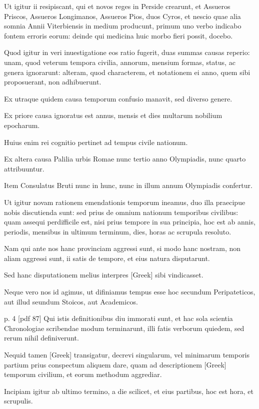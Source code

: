 Ut igitur ii resipiscant, qui et novos reges in Perside crearunt,
et Assueros Priscos, Assueros Longimanos, Assueros Pios, duos Cyros,
et nescio quae alia somnia Annii Viterbiensis in medium producunt,
primum uno verbo indicabo fontem erroris eorum: deinde qui medicina
huic morbo fieri possit, docebo.

Quod igitur in veri inuestigatione
eos ratio fugerit, duas summas causas reperio: unam, quod veterum
tempora civilia, annorum, mensium formas, status, ac genera ignorarunt:
alteram, quod characterem, et notationem ei anno, quem sibi
proposuerant, non adhibuerunt.

Ex utraque quidem causa temporum
confusio manavit, sed diverso genere.

Ex priore causa ignoratus est
annus, mensis et dies multarum nobilium epocharum.

Huius enim
rei cognitio pertinet ad tempus civile nationum.

Ex altera causa Palilia
urbis Romae nunc tertio anno Olympiadis, nunc quarto attribuuntur.

Item Consulatus Bruti nunc in hunc, nunc in illum annum
Olympiadis confertur.

Ut igitur novam rationem emendationis temporum
ineamus, duo illa praecipue nobis discutienda sunt: sed prius
de omnium nationum temporibus civilibus: quam assequi perdifficile
est, nisi prius tempore in sua principia, hoc est ab annis, periodis,
mensibus in ultimum terminum, dies, horas ac scrupula resoluto.

Nam qui ante nos hanc provinciam aggressi sunt, si modo hanc nostram,
non aliam aggressi sunt, ii satis de tempore, et eius natura
disputarunt.

Sed hanc disputationem melius interpres \textgreek{[Greek]}
sibi vindicasset.

Neque vero nos id agimus, ut difiniamus
tempus esse hoc secundum Peripateticos, aut illud seundum Stoicos,
aut Academicos.

p. 4 [pdf 87]
%
Qui istis definitionibus diu immorati sunt, et hac
sola scientia Chronologiae scribendae modum terminarunt, illi fatis
verborum quiedem, sed rerum nihil definiverunt.

Nequid tamen
\textgreek{[Greek]} transigatur, decrevi singularum, vel minimarum temporis
partium prius conspectum aliquem dare, quam ad descriptionem
\textgreek{[Greek]} temporum civilium, et eorum methodum aggrediar.

Incipiam igitur ab ultimo termino, a die scilicet, et eius partibus,
hoc est hora, et scrupulis.

